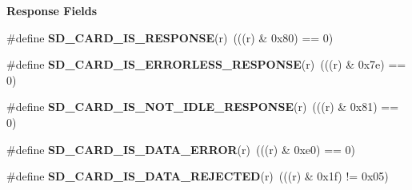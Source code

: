 \begin{Indent}\textbf{ Response Fields}\par
\begin{DoxyCompactItemize}
\item 
\mbox{\label{spi-sd-card_8c_aede80caaa93ff7132711ddcae28b7f10}} 
\#define {\bfseries S\+D\+\_\+\+C\+A\+R\+D\+\_\+\+I\+S\+\_\+\+R\+E\+S\+P\+O\+N\+SE}(r)~(((r) \& 0x80) == 0)
\item 
\mbox{\label{spi-sd-card_8c_a15852cd0397d01c297fdd3fb95fffa77}} 
\#define {\bfseries S\+D\+\_\+\+C\+A\+R\+D\+\_\+\+I\+S\+\_\+\+E\+R\+R\+O\+R\+L\+E\+S\+S\+\_\+\+R\+E\+S\+P\+O\+N\+SE}(r)~(((r) \& 0x7e) == 0)
\item 
\mbox{\label{spi-sd-card_8c_ab7433e176f29e0433f5dfdd4147c5fac}} 
\#define {\bfseries S\+D\+\_\+\+C\+A\+R\+D\+\_\+\+I\+S\+\_\+\+N\+O\+T\+\_\+\+I\+D\+L\+E\+\_\+\+R\+E\+S\+P\+O\+N\+SE}(r)~(((r) \& 0x81) == 0)
\item 
\mbox{\label{spi-sd-card_8c_afc950561b5a62939e318390fa9017fea}} 
\#define {\bfseries S\+D\+\_\+\+C\+A\+R\+D\+\_\+\+I\+S\+\_\+\+D\+A\+T\+A\+\_\+\+E\+R\+R\+OR}(r)~(((r) \& 0xe0) == 0)
\item 
\mbox{\label{spi-sd-card_8c_adc46c3d855548bfdd601404bfc7acb64}} 
\#define {\bfseries S\+D\+\_\+\+C\+A\+R\+D\+\_\+\+I\+S\+\_\+\+D\+A\+T\+A\+\_\+\+R\+E\+J\+E\+C\+T\+ED}(r)~(((r) \& 0x1f) != 0x05)
\end{DoxyCompactItemize}
\end{Indent}
